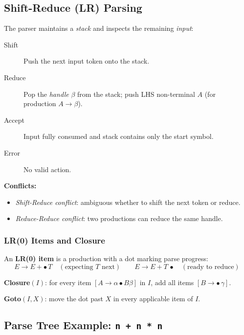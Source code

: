\documentclass[12pt,a4paper]{article}
\begin{document}
\subsection{Shift-Reduce (LR) Parsing}

The parser maintains a \emph{stack} and inspects the remaining \emph{input}:
\begin{description}
  \item[Shift] Push the next input token onto the stack.
  \item[Reduce] Pop the \emph{handle} $\beta$ from the stack; push LHS non-terminal $A$
        (for production $A \to \beta$).
  \item[Accept] Input fully consumed and stack contains only the start symbol.
  \item[Error] No valid action.
\end{description}

\textbf{Conflicts:}
\begin{itemize}
  \item \emph{Shift-Reduce conflict}: ambiguous whether to shift the next token or reduce.
  \item \emph{Reduce-Reduce conflict}: two productions can reduce the same handle.
\end{itemize}

\subsubsection{LR(0) Items and Closure}

An \textbf{LR(0) item} is a production with a dot marking parse progress:
\[
E \to E + \bullet\, T \quad (\text{expecting } T \text{ next})
\qquad
E \to E + T\, \bullet \quad (\text{ready to reduce})
\]

\textbf{Closure}$(I)$: for every item $[A \to \alpha \bullet B \beta]$ in $I$,
add all items $[B \to \bullet\, \gamma]$.

\textbf{Goto}$(I, X)$: move the dot past $X$ in every applicable item of $I$.

\subsection{Parse Tree Example: \texttt{n + n * n}}

\begin{center}
\end{center}
\end{document}
